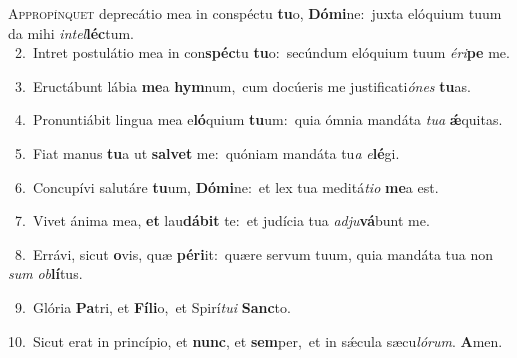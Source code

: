 \lettrine{\initial\textcolor{\initialcolor}{A}}{ppropínquet} deprecátio mea in conspéctu \textbf{tu}\-o, \textbf{Dó}\-\textbf{mi}ne:~\star juxta elóquium tuum da mihi \textit{in}\-\textit{tel}\textbf{léc}tum.\\
{\numbfont\textcolor{\numbcolor}{~2.}}~Intret postulátio mea in con\-\textbf{spéc}\-tu \textbf{tu}\-o:~\star secúndum elóquium tuum \textit{é}\-\textit{ri}\textbf{pe} me.\par
{\numbfont\textcolor{\numbcolor}{~3.}}~Eructábunt lábia \textbf{me}\-a \textbf{hym}\-num,~\star cum docúeris me justificati\-\textit{ó}\-\textit{nes} \textbf{tu}\-as.\par
{\numbfont\textcolor{\numbcolor}{~4.}}~Pronuntiábit lingua mea e\-\textbf{ló}\-quium \textbf{tu}\-um:~\star quia ómnia mandáta \textit{tu}\-\textit{a} \textbf{ǽ}\-quitas.\par
{\numbfont\textcolor{\numbcolor}{~5.}}~Fiat manus \textbf{tu}\-a ut \textbf{sal}\-\textbf{vet} me:~\star quóniam mandáta tu\textit{a} \textit{e}\-\textbf{lé}gi.\par
{\numbfont\textcolor{\numbcolor}{~6.}}~Concupívi salutáre \textbf{tu}\-um, \textbf{Dó}\-\textbf{mi}ne:~\star et lex tua meditá\-\textit{ti}\-\textit{o} \textbf{me}\-a est.\par
{\numbfont\textcolor{\numbcolor}{~7.}}~Vivet ánima mea, \textbf{et} lau\-\textbf{dá}\-\textbf{bit} te:~\star et judícia tua \textit{ad}\-\textit{ju}\textbf{vá}bunt me.\par
{\numbfont\textcolor{\numbcolor}{~8.}}~Errávi, sicut \textbf{o}\-vis, quæ \textbf{pér}\-\textbf{i}it:~\star quære servum tuum, quia mandáta tua non \textit{sum} \textit{ob}\-\textbf{lí}tus.\par
{\numbfont\textcolor{\numbcolor}{~9.}}~Glória \textbf{Pa}\-tri, et \textbf{Fí}\-\textbf{li}o,~\star et Spirí\-\textit{tu}\-\textit{i} \textbf{Sanc}\-to.\par
{\numbfont\textcolor{\numbcolor}{10.}}~Sicut erat in princípio, et \textbf{nunc}\-, et \textbf{sem}\-per,~\star et in sǽcula sæcu\-\textit{ló}\-\textit{rum}. \textbf{A}\-men.\par
